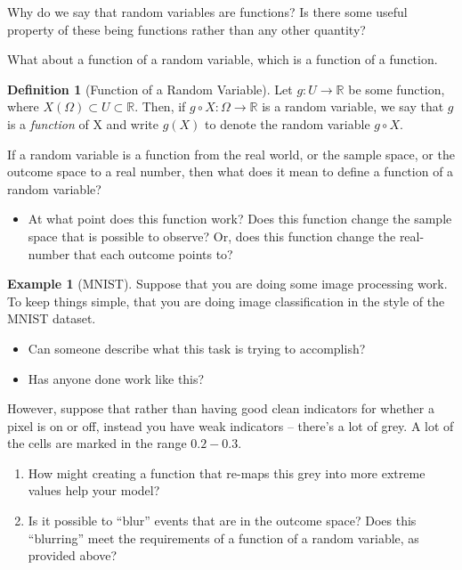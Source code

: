 \documentclass[
]{book}
\providecommand{\tightlist}{%
  \setlength{\itemsep}{0pt}\setlength{\parskip}{0pt}}
\theoremstyle{definition}
\newtheorem{definition}{Definition}[chapter]
\theoremstyle{definition}
\newtheorem{example}{Example}[chapter]
\theoremstyle{definition}
\theoremstyle{definition}
\theoremstyle{remark}
\begin{document}
Why do we say that random variables are functions? Is there some useful property of these being functions rather than any other quantity?

What about a function of a random variable, which is a function of a function.

\begin{definition}[Function of a Random Variable]
Let \(g : U \rightarrow \mathbb{R}\) be some function, where \(X(\Omega) \subset U \subset \mathbb{R}\). Then, if \(g \circ X : \Omega \rightarrow \mathbb{R}\) is a random variable, we say that \(g\) is a \emph{function} of X and write \(g(X)\) to denote the random variable \(g \circ X\).
\end{definition}

If a random variable is a function from the real world, or the sample space, or the outcome space to a real number, then what does it mean to define a function of a random variable?

\begin{itemize}
\tightlist
\item
  At what point does this function work? Does this function change the sample space that is possible to observe? Or, does this function change the real-number that each outcome points to?
\end{itemize}

\begin{example}[MNIST]

Suppose that you are doing some image processing work. To keep things simple, that you are doing image classification in the style of the MNIST dataset.

\begin{itemize}
\tightlist
\item
  Can someone describe what this task is trying to accomplish?
\item
  Has anyone done work like this?
\end{itemize}

However, suppose that rather than having good clean indicators for whether a pixel is on or off, instead you have weak indicators -- there's a lot of grey. A lot of the cells are marked in the range \(0.2 - 0.3\).

\begin{enumerate}
\def\labelenumi{\arabic{enumi}.}
\tightlist
\item
  How might creating a function that re-maps this grey into more extreme values help your model?
\item
  Is it possible to ``blur'' events that are in the outcome space? Does this ``blurring'' meet the requirements of a function of a random variable, as provided above?
\end{enumerate}

\end{example}
\end{document}
